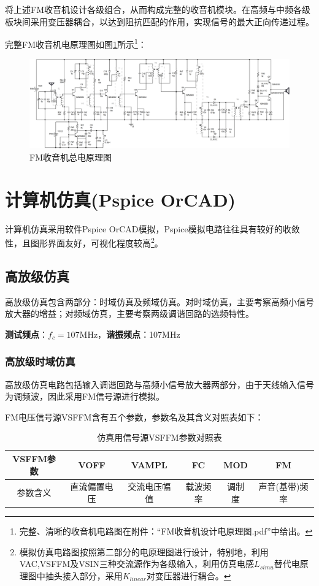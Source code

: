 \documentclass[a4paper,12pt,twoside]{article}
\begin{document}
将上述FM收音机设计各级组合，从而构成完整的收音机模块。在高频与中频各级板块间采用变压器耦合，以达到阻抗匹配的作用，实现信号的最大正向传递过程。

完整FM收音机电原理图如图\ref{横板总电路}所示\footnote{完整、清晰的收音机电路图在附件：“FM收音机设计电原理图.pdf”中给出。}：
\begin{figure}[H]
    \centering
    \includegraphics[scale=0.081]{横板总电路图.png}
    \caption{FM收音机总电原理图}
    \label{横板总电路}
\end{figure}


\section{计算机仿真(Pspice OrCAD)}
计算机仿真采用软件Pspice OrCAD模拟，Pspice模拟电路往往具有较好的收敛性，且图形界面友好，可视化程度较高\footnote{模拟仿真电路图按照第二部分的电原理图进行设计，特别地，利用VAC,VSFFM及VSIN三种交流源作为各级输入，利用仿真电感$L_{simu}$替代电原理图中抽头接入部分，采用$K_{linear}$对变压器进行耦合。}。
\subsection{高放级仿真}
高放级仿真包含两部分：时域仿真及频域仿真。对时域仿真，主要考察高频小信号放大器的增益；对频域仿真，主要考察两级调谐回路的选频特性。

\textbf{测试频点}：$f_{c}=107$MHz，\textbf{谐振频点}：107MHz
\subsubsection{高放级时域仿真}
高放级仿真电路包括输入调谐回路与高频小信号放大器两部分，由于天线输入信号为调频波，因此采用FM信号源进行模拟。

FM电压信号源VSFFM含有五个参数，参数名及其含义对照表如下：
\begin{table}[H]
    \centering
    \begin{tabular}{cccccc}
    \toprule[1.2pt]
    \midrule
        VSFFM参数 & VOFF & VAMPL &FC&MOD&FM \\
        \midrule
        参数含义 &直流偏置电压 &交流电压幅值 &载波频率 &调制度 &声音(基带)频率 \\
        \bottomrule[1.2pt]
    \end{tabular}
    \caption{仿真用信号源VSFFM参数对照表}
    \label{VSFFM}
\end{table}
\end{document}
